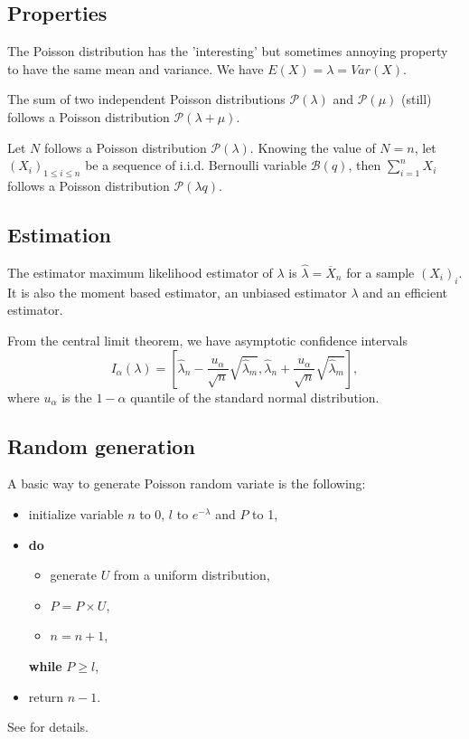 \subsection{Properties}
The Poisson distribution has the 'interesting' but sometimes annoying property to have the same mean and variance. We have $E(X) = \lambda = Var(X)$.

The sum of two independent Poisson distributions $\mathcal P(\lambda)$ and $\mathcal P(\mu)$ (still) follows a Poisson distribution $\mathcal P(\lambda+\mu)$.

Let $N$ follows a Poisson distribution $\mathcal P(\lambda)$. Knowing the value of $N=n$, let $(X_i)_{1\leq i\leq n}$ be a sequence of i.i.d. Bernoulli variable $\mathcal B(q)$, then $\sum_{i=1}^nX_i$
follows a Poisson distribution $\mathcal P(\lambda q)$.


\subsection{Estimation}
The estimator maximum likelihood estimator of $\lambda$ is $\hat \lambda = \overline X_n$ for a sample $(X_i)_i$. It is also the moment based estimator, an unbiased estimator $\lambda$ and an efficient estimator.

From the central limit theorem, we have asymptotic confidence intervals
$$
I_\alpha(\lambda) = \left[\hat \lambda_n - \frac{u_\alpha}{\sqrt n} \sqrt{\hat \lambda_m} , \hat \lambda_n + \frac{u_\alpha}{\sqrt n} \sqrt{\hat \lambda_m} \right],
$$
where $u_\alpha$ is the $1-\alpha$ quantile of the standard normal distribution.

\subsection{Random generation}
A basic way to generate Poisson random variate is the following:
\begin{itemize}
\item initialize variable $n$ to 0, $l$ to $e^{-\lambda}$ and $P$ to 1,
\item \textbf{do} 
	\begin{itemize}
	\item generate $U$ from a uniform distribution,
	\item $P = P \times U$,
	\item $n=n+1$,
	\end{itemize}
	\textbf{while} $P\geq l$, 
\item return $n-1$.
\end{itemize}
See \cite{knuth02} for details.

